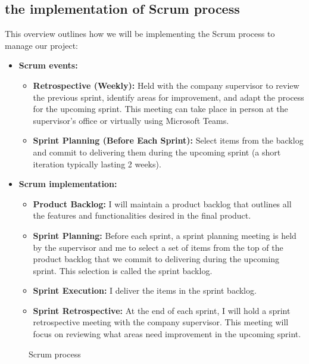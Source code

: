 \subsection*{the implementation of Scrum process}
This overview outlines how we will be implementing the Scrum process to manage our project:
\begin{itemize}
    \item \textbf{Scrum events:} \begin{itemize}
              \item \textbf{Retrospective (Weekly):} Held with the company supervisor to review the previous sprint, identify areas for improvement, and adapt the process for the upcoming sprint. This meeting can take place in person at the supervisor's office or virtually using Microsoft Teams.
              \item \textbf{Sprint Planning (Before Each Sprint):} Select items from the backlog and commit to delivering them during the upcoming sprint (a short iteration typically lasting 2 weeks).
          \end{itemize}
    \item \textbf{Scrum implementation:} \begin{itemize}
              \item \textbf{Product Backlog:} I will maintain a product backlog that outlines all the features and functionalities desired in the final product.
              \item \textbf{Sprint Planning:} Before each sprint, a sprint planning meeting is held by the supervisor and me to select a set of items from the top of the product backlog that we commit to delivering during the upcoming sprint. This selection is called the sprint backlog.
              \item \textbf{Sprint Execution:} I deliver the items in the sprint backlog.
              \item \textbf{Sprint Retrospective:} At the end of each sprint, I will hold a sprint retrospective meeting with the company supervisor. This meeting will focus on reviewing what areas need improvement in the upcoming sprint.
          \end{itemize}

\end{itemize}

\begin{figure}[htpb]
    \centering
    \caption{Scrum process}
    \label{fig:scrum_process}
\end{figure}

